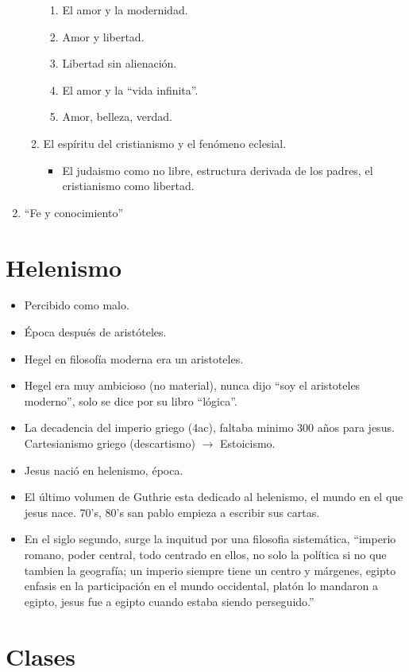 \begin{enumerate}
\begin{enumerate}
\begin{itemize}
{                        }
                \end{itemize}
                \begin{enumerate}
                    \item El amor y la modernidad. 
                    \item Amor y libertad. 
                    \item Libertad sin alienación. 
                    \item El amor y la ``vida infinita''.
                    \item Amor, belleza, verdad. 
                \end{enumerate}
            \item El espíritu del cristianismo y el fenómeno eclesial.
                \begin{itemize}
                    \item El judaismo como no libre, estructura derivada de los padres, el cristianismo como libertad. 
                \end{itemize}
        \end{enumerate}
    
    \item ``Fe y conocimiento''
\end{enumerate}

\section{Helenismo}
\begin{itemize}
    \item Percibido como malo.
    \item Época después de aristóteles. 
    \item Hegel en filosofía moderna era un aristoteles. 
    \item Hegel era muy ambicioso (no material), nunca dijo ``soy el aristoteles moderno'', solo se dice por su libro ``lógica''.
    \item La decadencia del imperio griego (4ac), faltaba minimo 300 años para jesus. Cartesianismo griego (descartismo) $\rightarrow$ Estoicismo. 
    \item Jesus nació en helenismo, época.
    \item El último volumen de Guthrie esta dedicado al helenismo, el mundo en el que jesus nace. 70's, 80's san pablo empieza a escribir sus cartas. 
    \item En el siglo segundo, surge la inquitud por una filosofia sistemática, ``imperio romano, poder central, todo centrado en ellos, no solo la política si no que tambien la geografía; un imperio siempre tiene un centro y márgenes, egipto enfasis en la participación en el mundo occidental, platón lo mandaron a egipto, jesus fue a egipto cuando estaba siendo perseguido.''
\end{itemize}


\section{Clases}